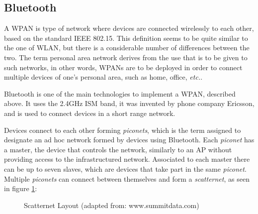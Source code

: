 \subsection{Bluetooth}
\label{subsection:bt}

A \gls{WPAN} is type of network where devices are connected wirelessly to each other, based on the standard IEEE 802.15. This definition seems to be quite similar to the one of \gls{WLAN}, but there is a considerable number of differences between the two. The term personal area network derives from the use that is to be given to such networks, in other words, \glspl{WPAN} are to be deployed in order to connect multiple devices of one's personal area, such as home, office, \textit{etc.}.

Bluetooth is one of the main technologies to implement a \gls{WPAN}, described above. It uses the 2.4GHz \gls{ISM} band, it was invented by phone company Ericsson, and is used to connect devices in a short range network.

Devices connect to each other forming \textit{piconets}, which is the term assigned to designate an ad hoc network formed by devices using Bluetooth. Each \textit{piconet} has a master, the device that controls the network, similarly to an \gls{AP} without providing access to the infrastructured network. Associated to each master there can be up to seven slaves, which are devices that take part in the same \textit{piconet}. Multiple \textit{piconets} can connect between themselves and form a \textit{scatternet}, as seen in figure \ref{fig:bluetooth}:

\begin{figure}[ht]
	\noindent{}
	\caption{\label{fig:bluetooth} Scatternet Layout (adapted from: www.summitdata.com)}
\end{figure}

